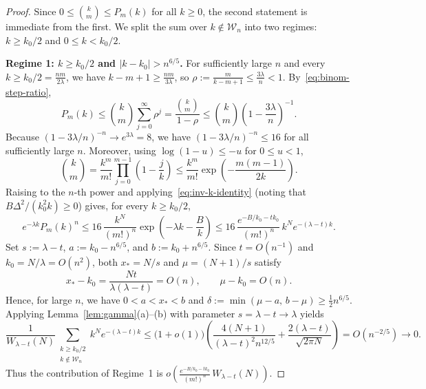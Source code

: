 \documentclass[11pt,a4paper]{article}
\theoremstyle{remark}
\begin{document}
\begin{proof}
Since $0 \le \binom{k}{m} \le P_m(k)$ for all $k\ge 0$, the second statement is immediate from the first. We split the sum over $k\notin\mathcal{W}_n$ into two regimes: $k\ge k_0/2$ and $0\le k < k_0/2$.

\medskip
\noindent\textbf{Regime 1: $k\ge k_0/2$ and $|k - k_0| > n^{6/5}$.}
For sufficiently large $n$ and every $k\ge k_0/2 = \frac{nm}{2\lambda}$, we have $k - m + 1 \ge \frac{nm}{3\lambda}$, so $\rho := \frac{m}{k-m+1} \le \frac{3\lambda}{n} < 1$. By~\eqref{eq:binom-step-ratio},
\[
  P_m(k) \le \binom{k}{m}\sum_{j=0}^{\infty} \rho^j
  = \frac{\binom{k}{m}}{1-\rho}
  \le \binom{k}{m}\left(1 - \frac{3\lambda}{n}\right)^{-1}.
\]
Because $(1 - 3\lambda/n)^{-n} \to e^{3\lambda} = 8$, we have $(1 - 3\lambda/n)^{-n} \le 16$ for all sufficiently large $n$. Moreover, using $\log(1-u) \le -u$ for $0\le u < 1$,
\[
  \binom{k}{m} = \frac{k^m}{m!}\prod_{j=0}^{m-1}\left(1 - \frac{j}{k}\right)
  \le \frac{k^m}{m!}\exp\!\left(-\frac{m(m-1)}{2k}\right).
\]
Raising to the $n$-th power and applying~\eqref{eq:inv-k-identity} (noting that $B\Delta^2/(k_0^2 k)\ge 0$) gives, for every $k\ge k_0/2$,
\[
  e^{-\lambda k} P_m(k)^n
  \le 16\,\frac{k^N}{(m!)^n}\exp\!\left(-\lambda k - \frac{B}{k}\right)
  \le 16\,\frac{e^{-B/k_0 - t k_0}}{(m!)^n}\, k^N e^{-(\lambda - t)k}.
\]
Set $s := \lambda - t$, $a := k_0 - n^{6/5}$, and $b := k_0 + n^{6/5}$. Since $t = O(n^{-1})$ and $k_0 = N/\lambda = O(n^2)$, both $x_* = N/s$ and $\mu = (N+1)/s$ satisfy
\[
  x_* - k_0 = \frac{N t}{\lambda(\lambda - t)} = O(n),
  \qquad
  \mu - k_0 = O(n).
\]
Hence, for large $n$, we have $0 < a < x_* < b$ and $\delta := \min(\mu - a,\, b - \mu) \ge \frac{1}{2}n^{6/5}$. Applying Lemma~\ref{lem:gamma}(a)--(b) with parameter $s = \lambda - t \to \lambda$ yields
\[
  \frac{1}{W_{\lambda - t}(N)}
  \sum_{\substack{k\ge k_0/2 \\ k\notin \mathcal{W}_n}} k^N e^{-(\lambda - t)k}
  \le \bigl(1 + o(1)\bigr)\left(\frac{4(N+1)}{(\lambda - t)^2 n^{12/5}} + \frac{2(\lambda - t)}{\sqrt{2\pi N}}\right)
  = O(n^{-2/5}) \to 0.
\]
Thus the contribution of Regime~1 is $o\!\left(\frac{e^{-B/k_0 - t k_0}}{(m!)^n}\,W_{\lambda - t}(N)\right)$.


\end{proof}
\end{document}
